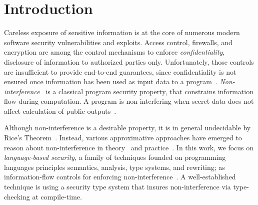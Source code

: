 \tocless\section{Introduction}
\label{sec:introduction}

Careless exposure of sensitive information is at the core of numerous modern software security vulnerabilities and exploits.
Access control, firewalls, and encryption are among the control mechanisms to enforce \emph{confidentiality}, \ie disclosure of information to  authorized parties only.
Unfortunately, those controls are insufficient to provide end-to-end guarantees, since confidentiality is not ensured once information has been used as input data to a program~\cite{zdancewic2004}.
\emph{Non-interference}~\cite{goguen1982} is a classical program security property, that constrains information flow during computation.
A program is non-interfering when secret data does not affect calculation of public outputs~\cite{sabelfeld2003}.

Although non-interference is a desirable property, it is in general undecidable by Rice's Theorem~\cite{rice1953}. %
Instead, various approximative approaches have emerged to reason about non-interference in theory~\cite{VolpanoI1996,abadi1999b,bowman2015} and practice~\cite{Myers1999,hammer2009,Broberg2013,arzt2014,huang2014}.
In this work, we focus on \emph{language-based security},
a family of techniques founded on programming languages principles \eg semantics, analysis, type systems, and rewriting;
as information-flow controls for enforcing non-interference~\cite{schneider2001,sabelfeld2003}.
A well-established technique %
is using a security type system that insures non-interference via type-checking at compile-time.

